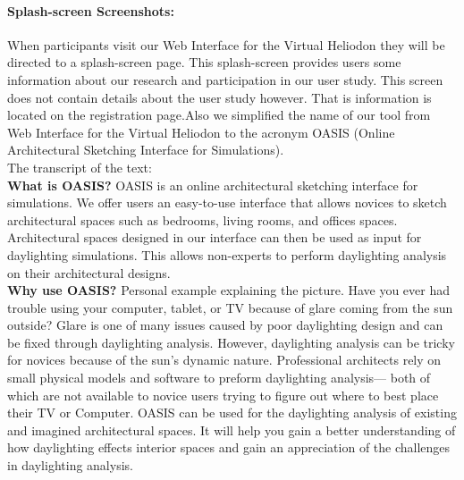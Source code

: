 \documentclass[12pt]{article}
\begin{document}

\newpage
\paragraph{Splash-screen Screenshots:}
When participants visit our Web Interface for the Virtual Heliodon they will be directed to a splash-screen page. 
This splash-screen provides users some information about our research and participation in our user study. This screen does not contain details about the user study however. That is information is located on the registration page.Also we simplified the name of our tool from Web Interface for the Virtual Heliodon to the acronym OASIS (Online Architectural Sketching Interface for Simulations).\\

\noindent The transcript of the text:\\

\textbf{What is OASIS?}
OASIS is an online architectural sketching interface for simulations. 
We offer users an easy-to-use interface that allows novices to sketch architectural spaces such as bedrooms, living rooms, and offices spaces. 
Architectural spaces designed in our interface can then be used as input for daylighting simulations. 
This allows non-experts to perform daylighting analysis on their architectural designs.\\

\textbf{Why use OASIS?}
Personal example explaining the picture. 
Have you ever had trouble using your computer, tablet, or TV because of glare coming from the sun outside? 
Glare is one of many issues caused by poor daylighting design and can be fixed through daylighting analysis. 
However, daylighting analysis can be tricky for novices because of the sun's dynamic nature. 
Professional architects rely on small physical models and software to preform daylighting analysis— 
both of which are not available to novice users trying to figure out where to best place their TV or Computer. 
OASIS can be used for the daylighting analysis of existing and imagined architectural spaces. 
It will help you gain a better understanding of how daylighting effects interior spaces and gain an appreciation of the challenges in daylighting analysis.\\
\end{document}
